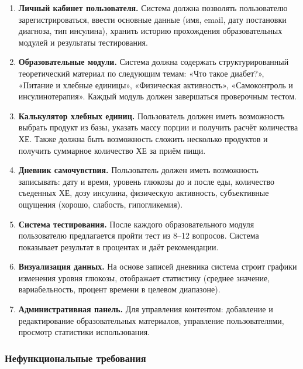 \documentclass[14pt, a4paper]{extarticle}
\begin{document}
\begin{enumerate}
\item \textbf{Личный кабинет пользователя.} Система должна позволять пользователю зарегистрироваться, ввести основные данные (имя, email, дату постановки диагноза, тип инсулина), хранить историю прохождения образовательных модулей и результаты тестирования.

\item \textbf{Образовательные модули.} Система должна содержать структурированный теоретический материал по следующим темам: «Что такое диабет?», «Питание и хлебные единицы», «Физическая активность», «Самоконтроль и инсулинотерапия». Каждый модуль должен завершаться проверочным тестом.

\item \textbf{Калькулятор хлебных единиц.} Пользователь должен иметь возможность выбрать продукт из базы, указать массу порции и получить расчёт количества ХЕ. Также должна быть возможность сложить несколько продуктов и получить суммарное количество ХЕ за приём пищи.

\item \textbf{Дневник самочувствия.} Пользователь должен иметь возможность записывать: дату и время, уровень глюкозы до и после еды, количество съеденных ХЕ, дозу инсулина, физическую активность, субъективные ощущения (хорошо, слабость, гипогликемия).

\item \textbf{Система тестирования.} После каждого образовательного модуля пользователю предлагается пройти тест из 8–12 вопросов. Система показывает результат в процентах и даёт рекомендации.

\item \textbf{Визуализация данных.} На основе записей дневника система строит графики изменения уровня глюкозы, отображает статистику (среднее значение, вариабельность, процент времени в целевом диапазоне).

\item \textbf{Административная панель.} Для управления контентом: добавление и редактирование образовательных материалов, управление пользователями, просмотр статистики использования.
\end{enumerate}

\subsubsection{Нефункциональные требования}
\end{document}
